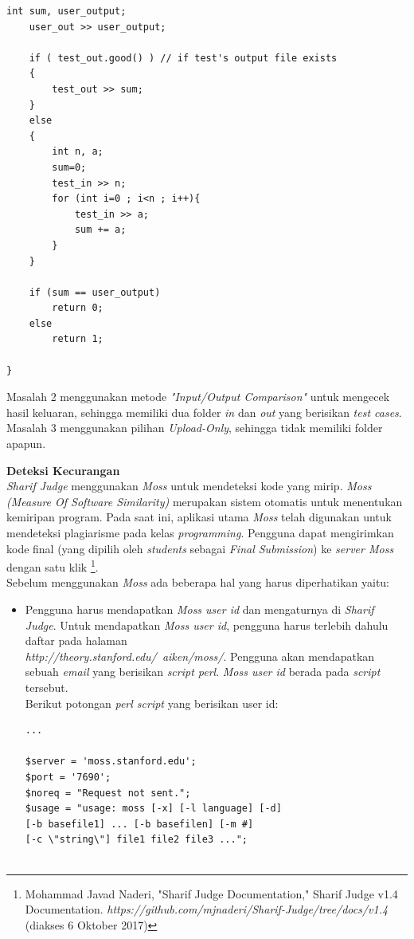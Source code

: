 \documentclass[a4paper,twoside]{article}
\begin{document}
\begin{enumerate}
\begin{enumerate}
\begin{lstlisting}[backgroundcolor = \color{lightgray}]
	int sum, user_output;
	user_out >> user_output;
	
	if ( test_out.good() ) // if test's output file exists
	{
		test_out >> sum;
	}
	else
	{
		int n, a;
		sum=0;
		test_in >> n;
		for (int i=0 ; i<n ; i++){
			test_in >> a;
			sum += a;
		}
	}

	if (sum == user_output)
		return 0;
	else
		return 1;

}			
			\end{lstlisting}
			
			
			Masalah 2 menggunakan metode \textit{"Input/Output Comparison"} untuk mengecek hasil keluaran, sehingga memiliki dua folder \textit{in} dan \textit{out} yang berisikan \textit{test cases}. Masalah 3 menggunakan pilihan \textit{Upload-Only}, sehingga tidak memiliki folder apapun.
		
			\textbf{Deteksi Kecurangan} \\
			\textit{Sharif Judge} menggunakan \textit{Moss} untuk mendeteksi kode yang mirip. \textit{Moss (Measure Of Software Similarity)} merupakan sistem otomatis untuk menentukan kemiripan program. Pada saat ini, aplikasi utama \textit{Moss} telah digunakan untuk mendeteksi plagiarisme pada kelas \textit{programming}. Pengguna dapat mengirimkan kode final (yang dipilih oleh \textit{students} sebagai \textit{Final Submission}) ke \textit{server Moss} dengan satu klik \footnote{Mohammad Javad Naderi, "Sharif Judge Documentation," Sharif Judge v1.4 Documentation. \textit{https://github.com/mjnaderi/Sharif-Judge/tree/docs/v1.4} (diakses 6 Oktober 2017)}.\\
			
			Sebelum menggunakan \textit{Moss} ada beberapa hal yang harus diperhatikan yaitu:
			\begin{itemize}
				\item Pengguna harus mendapatkan \textit{Moss user id} dan mengaturnya di \textit{Sharif Judge}. Untuk mendapatkan \textit{Moss user id}, pengguna harus terlebih dahulu daftar pada halaman \\ \textit{http://theory.stanford.edu/~aiken/moss/}. Pengguna akan mendapatkan sebuah \textit{email} yang berisikan \textit{script perl}. \textit{Moss user id} berada pada \textit{script} tersebut. \\
				Berikut potongan \textit{perl script} yang berisikan user id:
				
				\begin{lstlisting}[backgroundcolor = \color{lightgray}]
...

$server = 'moss.stanford.edu';
$port = '7690';
$noreq = "Request not sent.";
$usage = "usage: moss [-x] [-l language] [-d] 
[-b basefile1] ... [-b basefilen] [-m #] 
[-c \"string\"] file1 file2 file3 ...";


\end{lstlisting}
\end{itemize}
\end{enumerate}
\end{enumerate}
\end{document}
